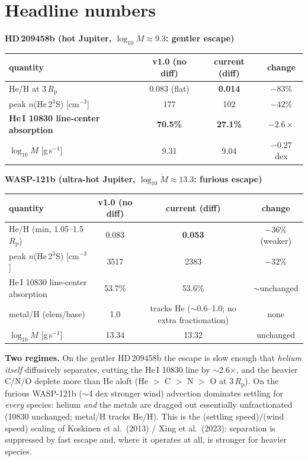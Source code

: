 \documentclass{my_memo}
\newcommand{\Rp}{R_{\mathrm{p}}}
\newcommand{\Mdot}{\dot{M}}
\begin{document}
\section{Headline numbers}

\begin{table}[h]
\centering
{\bfseries HD\,209458b (hot Jupiter, $\log_{10}\Mdot\approx9.3$: gentler escape)}\par
\vspace{3pt}
\begin{tabular}{lccc}
\toprule
quantity & v1.0 (no diff) & current (diff) & change \\
\midrule
He/H at 3\,$\Rp$ & 0.083 (flat) & \textbf{0.014} & $-83\%$ \\
peak $n$(He\,2$^3$S) [cm$^{-3}$] & 177 & 102 & $-42\%$ \\
\textbf{He\,I 10830 line-center absorption} & \textbf{70.5\%} & \textbf{27.1\%} & \textbf{$-2.6\times$} \\
$\log_{10}\Mdot$ [g\,s$^{-1}$] & 9.31 & 9.04 & $-0.27$ dex \\
\bottomrule
\end{tabular}

\vspace{10pt}
{\bfseries WASP-121b (ultra-hot Jupiter, $\log_{10}\Mdot\approx13.3$: furious escape)}\par
\vspace{3pt}
\begin{tabular}{lccc}
\toprule
quantity & v1.0 (no diff) & current (diff) & change \\
\midrule
He/H (min, 1.05--1.5\,$\Rp$) & 0.083 & \textbf{0.053} & $-36\%$ (weaker) \\
peak $n$(He\,2$^3$S) [cm$^{-3}$] & 3517 & 2383 & $-32\%$ \\
He\,I 10830 line-center absorption & 53.7\% & 53.6\% & $\sim$unchanged \\
metal/H (elem/base) & 1.0 & tracks He ($\sim$0.6--1.0; no extra fractionation) & none \\
$\log_{10}\Mdot$ [g\,s$^{-1}$] & 13.34 & 13.32 & unchanged \\
\bottomrule
\end{tabular}
\end{table}

\textbf{Two regimes.} On the gentler HD\,209458b the escape is slow enough that \emph{helium
itself} diffusively separates, cutting the He\,I 10830 line by $\sim$2.6$\times$, and the
heavier C/N/O deplete more than He aloft (He $>$ C $>$ N $>$ O at 3\,$\Rp$). On the furious
WASP-121b ($\sim$4 dex stronger wind) advection dominates settling for \emph{every} species:
helium \emph{and} the metals are dragged out essentially unfractionated (10830 unchanged;
metal/H tracks He/H). This is the (settling speed)/(wind speed) scaling of Koskinen et al.\
(2013) / Xing et al.\ (2023): separation is suppressed by fast escape and, where it operates
at all, is stronger for heavier species.
\end{document}
